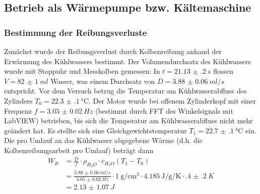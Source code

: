 \subsection{Betrieb als Wärmepumpe bzw. Kältemaschine}
\subsubsection{Bestimmung der Reibungsverluste}
Zunächst wurde der Reibungsverlust durch Kolbenreibung anhand der Erwärmung des Kühlwassers bestimmt.
Der Volumendurchsatz des Kühlwassers wurde mit Stoppuhr und Messkolben gemessen: In $t=\SI{21.13(20)}{s}$ flossen $V=\SI{82(1)}{ml}$ Wasser, was einem Durchsatz von $D=\SI{3.88(6)}{ml/s}$ entspricht. Vor dem Versuch betrug die Temperatur am Kühlwasserabfluss des Zylinders $T_0=\SI{22.3(1)}{\degreeCelsius}$. Der Motor wurde bei offenem Zylinderkopf mit einer Frequenz $f=\SI{3.05(2)}{Hz}$ (bestimmt durch FFT des Winkelsignals mit LabVIEW) betrieben, bis sich die Temperatur am Kühlwasserabfluss nicht mehr geändert hat. Es stellte sich eine Gleichgewichtstemperatur $T_1=\SI{22.7(1)}{\degreeCelsius}$ ein. Die pro Umlauf an das Kühlwasser abgegebene Wärme (d.h. die Kolbenreibungsarbeit pro Umlauf) beträgt dann
\begin{align}
	W_R&=\frac{D}{f}\cdot \rho_{H_2O}\cdot c_{H_2O}(T_1-T_0) \\
	&=\frac{\SI{3.88(6)}{ml/s}}{\SI{3.05(2)}{Hz}}\cdot \SI{1}{\g\per\cubic\cm}\cdot \SI{4.185}{\joule\per\gram\per\kelvin}\cdot \SI{.4(2)}{K} \\
	&=\SI{2.13(107)}{J}
\label{eq:reibungswaerme}
\end{align}
